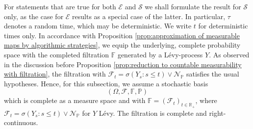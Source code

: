 \documentclass[11pt,a4paper,twoside,openany]{report}
\numberwithin{equation}{section}
\theoremstyle{plain} %
\theoremstyle{definition} %
\theoremstyle{remark} %
\begin{document}
For statements that are true for both \(\mathcal{E}\) and \(\mathcal{S}\) we shall formulate the result for \(\mathcal{S}\) only, as the case for \(\mathcal{E}\) results as a special case of the latter. In particular, \(\tau\) denotes a random time, which may be deterministic. We write \(t\) for deterministic times only. 
In accordance with Proposition \ref{prop:approximation of measurable maps by algorithmic strategies}, we equip the underlying, complete probability space with the completed filtration \(\mathbb{F}\) generated by a Lévy-process \(Y\). As observed in the discussion before Proposition \ref{prop:reduction to countable measurability with filtration}, the filtration with \(\mathcal{F}_t=\sigma(Y_s:s\leq t)\vee \mathcal{N}_{\mathbb{P}}\) satisfies the usual hypotheses. Hence, for this subsection, we assume a stochastic basis
\begin{equation}\label{eq:stochastic basis satisfying usual hypotheses}
    (\Omega,\mathcal{F},\mathbb{F},\mathbb{P})
\end{equation}
which is complete as a measure space and with \(\mathbb{F}=(\mathcal{F}_t)_{t\in\mathbb{R}_+}\), where \(\mathcal{F}_t=\sigma(Y_s:s\leq t)\vee \mathcal{N}_{\mathbb{P}}\) for \(Y\) Lévy. The filtration is complete and right-continuous.
\end{document}

